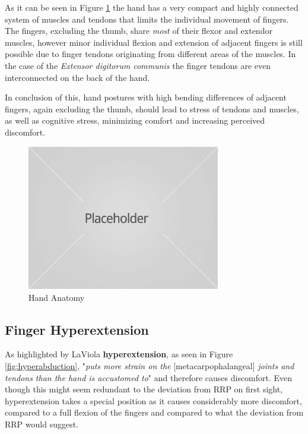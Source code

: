 \documentclass{sig-alternate-05-2015}
\begin{document}
As it can be seen in Figure \ref{fig:handAnatomy}
the hand has a very compact and highly connected system of muscles and tendons that limits the individual movement of fingers.
The fingers, excluding the thumb, share \textsl{most} of their flexor and extendor muscles, however minor individual flexion and extension of adjacent fingers is still possible due to finger tendons originating from different areas of the muscles. In the case of the \textit{Extensor digitorum communis} the finger tendons are even interconnected on the back of the hand. 

In conclusion of this, hand postures with high bending differences of adjacent fingers, again excluding the thumb, should lead to stress of tendons and muscles, as well as cognitive stress, minimizing comfort and increasing perceived discomfort.

\begin{figure}
\centering
\includegraphics[width=8.45cm]{placeholder1}
\vspace{-20pt}
\caption{Hand Anatomy}
\label{fig:handAnatomy}
\vspace{-10pt}
\end{figure}

\subsection{Finger Hyperextension}

As highlighted by LaViola \cite{laviola1999survey} \textbf{hyperextension}, as seen in Figure \ref{fig:hyperabduction}, "\textit{puts more strain on the }[metacarpophalangeal] \textit{joints and tendons than the hand is accustomed to}" \cite{laviola1999survey} and therefore causes discomfort. Even though this might seem redundant to the deviation from RRP on first sight, hyperextension takes a special position as it causes considerably more discomfort, compared to a full flexion of the fingers and compared to what the deviation from RRP would suggest.
\end{document}
